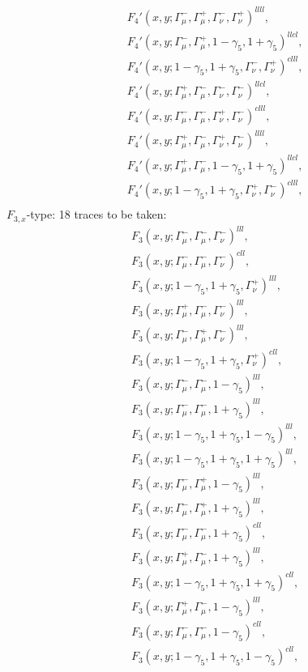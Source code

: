 \begin{align*}
&F_4'(x,y;\Gamma_\mu^-,\Gamma_\mu^+,\Gamma_\nu^-,\Gamma_\nu^+)^{llll},\\
&F_4'(x,y;\Gamma_\mu^-,\Gamma_\mu^+,1-\gamma_5,1+\gamma_5)^{llcl},\\
&F_4'(x,y;1-\gamma_5,1+\gamma_5,\Gamma_\nu^-,\Gamma_\nu^+)^{clll},\\
&F_4'(x,y;\Gamma_\mu^+,\Gamma_\mu^-,\Gamma_\nu^-,\Gamma_\nu^-)^{llcl},\\
&F_4'(x,y;\Gamma_\mu^-,\Gamma_\mu^-,\Gamma_\nu^+,\Gamma_\nu^-)^{clll},\\
&F_4'(x,y;\Gamma_\mu^+,\Gamma_\mu^-,\Gamma_\nu^+,\Gamma_\nu^-)^{llll},\\
&F_4'(x,y;\Gamma_\mu^+,\Gamma_\mu^-,1-\gamma_5,1+\gamma_5)^{llcl},\\
&F_4'(x,y;1-\gamma_5,1+\gamma_5,\Gamma_\nu^+,\Gamma_\nu^-)^{clll},\\
\end{align*}
$F_{3,x}$-type: 18 traces to be taken:
\begin{align*}
&F_3(x,y;\Gamma_\mu^-,\Gamma_\mu^-,\Gamma_\nu^-)^{lll},\\
&F_3(x,y;\Gamma_\mu^-,\Gamma_\mu^-,\Gamma_\nu^-)^{cll},\\
&F_3(x,y;1-\gamma_5,1+\gamma_5,\Gamma_\nu^+)^{lll},\\
&F_3(x,y;\Gamma_\mu^+,\Gamma_\mu^-,\Gamma_\nu^-)^{lll},\\
&F_3(x,y;\Gamma_\mu^-,\Gamma_\mu^+,\Gamma_\nu^-)^{lll},\\
&F_3(x,y;1-\gamma_5,1+\gamma_5,\Gamma_\nu^+)^{cll},\\
&F_3(x,y;\Gamma_\mu^-,\Gamma_\mu^-,1-\gamma_5)^{lll},\\
&F_3(x,y;\Gamma_\mu^-,\Gamma_\mu^-,1+\gamma_5)^{lll},\\
&F_3(x,y;1-\gamma_5,1+\gamma_5,1-\gamma_5)^{lll},\\
&F_3(x,y;1-\gamma_5,1+\gamma_5,1+\gamma_5)^{lll},\\
&F_3(x,y;\Gamma_\mu^-,\Gamma_\mu^+,1-\gamma_5)^{lll},\\
&F_3(x,y;\Gamma_\mu^-,\Gamma_\mu^+,1+\gamma_5)^{lll},\\
&F_3(x,y;\Gamma_\mu^-,\Gamma_\mu^-,1+\gamma_5)^{cll},\\
&F_3(x,y;\Gamma_\mu^+,\Gamma_\mu^-,1+\gamma_5)^{lll},\\
&F_3(x,y;1-\gamma_5,1+\gamma_5,1+\gamma_5)^{cll},\\
&F_3(x,y;\Gamma_\mu^+,\Gamma_\mu^-,1-\gamma_5)^{lll},\\
&F_3(x,y;\Gamma_\mu^-,\Gamma_\mu^-,1-\gamma_5)^{cll},\\
&F_3(x,y;1-\gamma_5,1+\gamma_5,1-\gamma_5)^{cll},\\
\end{align*}
